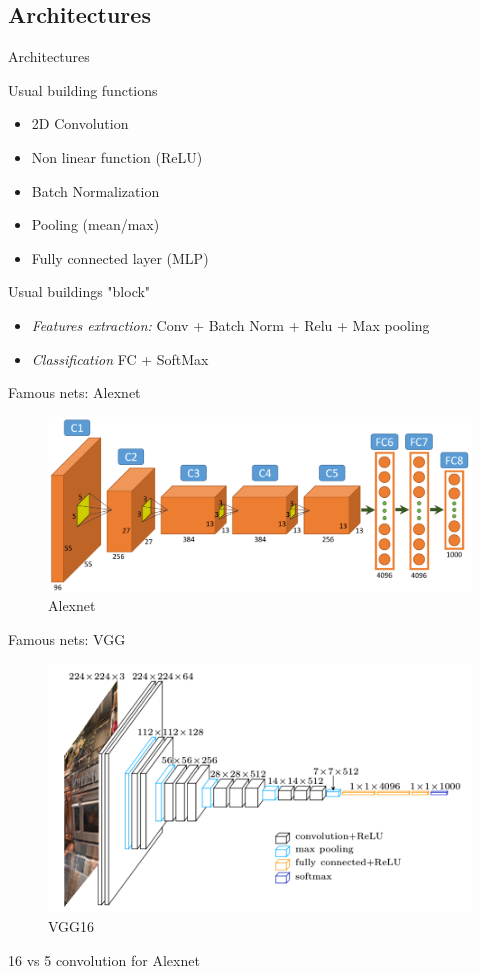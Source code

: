 \subsection{Architectures}

\begin{frame}{Architectures}
	\begin{block}{Usual building functions}
		\begin{itemize}
			\item 2D Convolution
			\item Non linear function (ReLU)
			\item Batch Normalization
			\item Pooling (mean/max)
			\item Fully connected layer (MLP)
		\end{itemize}		
	\end{block}
	
	\begin{block}{Usual buildings "block"}
		\begin{itemize}
			\item \textit{Features extraction:} Conv + Batch Norm + Relu + Max pooling
			\item \textit{Classification} FC + SoftMax
		\end{itemize}
	\end{block}
\end{frame}

\begin{frame}{Famous nets: Alexnet}

	\begin{figure}
		\includegraphics[width=\linewidth]{images/alexnet.png}
		\caption{Alexnet}
	\end{figure}
	
	\cite{ALEXNET}
\end{frame}

\begin{frame}{Famous nets: VGG}

	\begin{figure}
		\includegraphics[width=0.5\linewidth]{images/vgg.png}
		\caption{VGG16}
	\end{figure}
	16 vs 5 convolution for Alexnet	
	
	
	\cite{VGG}
\end{frame}


